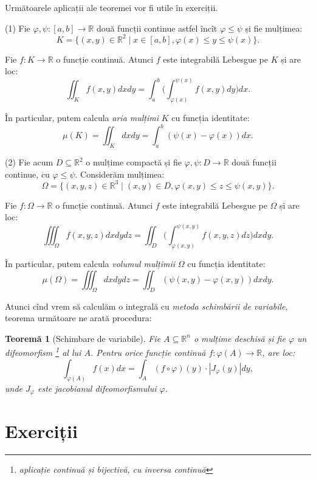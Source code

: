\documentclass[11pt,a4paper]{article}
\newcommand\seq{\subseteq}
\newcommand\RR{\mathbb{R}}
\theoremstyle{dotless}
\newtheorem{theorem}{Teorem\u{a}}[section]
\theoremstyle{dotlessdr}
\begin{document}
Următoarele aplicații ale teoremei vor fi utile în exerciții.

(1) Fie $\varphi, \psi : [a, b] \to \RR$ două funcții continue astfel încît
$\varphi \leq \psi$ și fie mulțimea:
\[
  K = \{(x, y) \in \RR^2 \mid x \in [a, b], \varphi(x) \leq y \leq \psi(x) \}.
\]

Fie $f : K \to \RR$ o funcție continuă. Atunci $f$ este integrabilă Lebesgue
pe $K$ și are loc:
\[
  \iint_K f(x, y) dx dy = \int_a^b \Big( \int_{\varphi(x)}^{\psi(x)} f(x, y) dy \Big) dx.
\]

În particular, putem calcula \emph{aria mulțimi} $K$ cu funcția identitate:
\[
  \mu(K) = \iint_K dx dy = \int_a^b (\psi(x) - \varphi(x)) dx.
\]

(2) Fie acum $D \seq \RR^2$ o mulțime compactă și fie $\varphi, \psi : D \to \RR$
două funcții continue, cu $\varphi \leq \psi$. Considerăm mulțimea:
\[
  \Omega = \{ (x, y, z) \in \RR^3 \mid (x, y) \in D, \varphi(x, y) \leq z \leq \psi(x, y) \}.
\]

Fie $f : \Omega \to \RR$ o funcție continuă. Atunci $f$ este integrabilă Lebesgue
pe $\Omega$ și are loc:
\[
  \iiint_\Omega f(x, y, z) dx dy dz = \iint_D \Big( \int_{\varphi(x, y)}^{\psi(x, y)} %
  f(x, y, z) dz \Big) dx dy.
\]

În particular, putem calcula \emph{volumul mulțimii} $\Omega$ cu funcția identitate:
\[
  \mu(\Omega) = \iiint_\Omega dx dy dz = \iint_D (\psi(x, y) - \varphi(x, y)) dx dy.
\]

Atunci cînd vrem să calculăm o integrală cu \emph{metoda schimbării de variabile},
teorema următoare ne arată procedura:

\begin{theorem}[Schimbare de variabile]\label{thm:sch-var}
  Fie $A \seq \RR^n$ o mulțime deschisă și fie $\varphi$ un \emph{difeomorfism} \footnote{%
    aplicație continuă și bijectivă, cu inversa continuă} al lui $A$. Pentru orice
  funcție continuă $f : \varphi(A) \to \RR$, are loc:
  \[
    \int_{\varphi(A)} f(x) dx = \int_A (f \circ \varphi)(y) \cdot |J_\varphi (y)| dy,
  \]
  unde $J_\varphi$ este jacobianul difeomorfismului $\varphi$.
\end{theorem}


\section{Exerciții}
\label{sec:exc}
\end{document}
